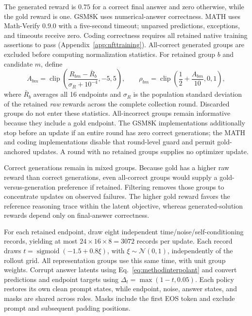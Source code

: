 \documentclass{article}
\begin{document}
The generated reward is $0.75$ for a correct final answer and zero otherwise, while the gold reward is one. GSM8K uses numerical-answer correctness. MATH uses Math-Verify 0.9.0 with a five-second timeout; unparsed predictions, exceptions, and timeouts receive zero. Coding correctness requires all retained native training assertions to pass (Appendix~\ref{app:nfttraining}). All-correct generated groups are excluded before computing normalization statistics. For retained group $b$ and candidate $m$, define
\begin{equation}
 A_{bm}=\operatorname{clip}\!\left(
 \frac{R_{bm}-\bar R_b}{\sigma_R+10^{-4}},-5,5\right),
 \qquad
 \rho_{bm}=\operatorname{clip}\!\left(\frac12+\frac{A_{bm}}{10},0,1\right),
 \label{eq:nftrewardnormalization}
\end{equation}
where $\bar R_b$ averages all 16 endpoints and $\sigma_R$ is the population standard deviation of the retained \emph{raw} rewards across the complete collection round. Discarded groups do not enter these statistics. All-incorrect groups remain informative because they include a gold endpoint. The GSM8K implementations additionally stop before an update if an entire round has zero correct generations; the MATH and coding implementations disable that round-level guard and permit gold-anchored updates. A round with no retained groups supplies no optimizer update.

Correct generations remain in mixed groups. Because gold has a higher raw reward than correct generations, even all-correct groups would supply a gold-versus-generation preference if retained. Filtering removes those groups to concentrate updates on observed failures. The higher gold reward favors the reference reasoning trace within the latent objective, whereas generated-solution rewards depend only on final-answer correctness.

For each retained endpoint, draw eight independent time/noise/self-conditioning records, yielding at most $24\times16\times8=3072$ records per update. Each record draws $t=\operatorname{sigmoid}(-1.5+0.8\xi)$, with $\xi\sim\mathcal N(0,1)$, independently of the rollout grid. All representation groups use this same time, with unit group weights. Corrupt answer latents using Eq.~\eqref{eq:methodinterpolant} and convert predictions and endpoint targets using $\Delta_t=\max(1-t,0.05)$. Each policy restores its own clean prompt states, while endpoint, noise, answer states, and masks are shared across roles. Masks include the first EOS token and exclude prompt and subsequent padding positions.
\end{document}
